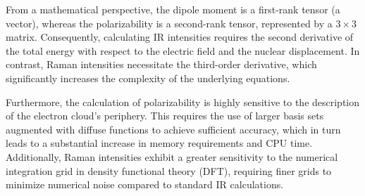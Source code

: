 \documentclass[a4paper,12pt]{scrartcl}
\begin{document}
From a mathematical perspective, the dipole moment is a first-rank tensor (a vector), whereas the polarizability is a second-rank tensor, represented by a $3 \times 3$ matrix. Consequently, calculating IR intensities requires the second derivative of the total energy with respect to the electric field and the nuclear displacement. In contrast, Raman intensities necessitate the third-order derivative, which significantly increases the complexity of the underlying equations. 

Furthermore, the calculation of polarizability is highly sensitive to the description of the electron cloud's periphery. This requires the use of larger basis sets augmented with diffuse functions to achieve sufficient accuracy, which in turn leads to a substantial increase in memory requirements and CPU time. Additionally, Raman intensities exhibit a greater sensitivity to the numerical integration grid in density functional theory (DFT), requiring finer grids to minimize numerical noise compared to standard IR calculations.
\end{document}
